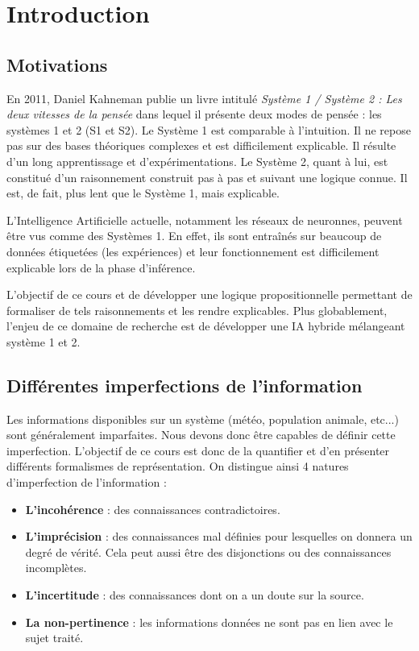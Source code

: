 \minitoc


\section{Introduction}

\subsection{Motivations} 

En 2011, Daniel Kahneman publie un livre intitulé \emph{Système 1 / Système 2 : Les deux vitesses de la pensée} 
dans lequel il présente deux modes de pensée : les systèmes 1 et 2 (S1 et S2). 
Le Système 1 est comparable à l'intuition. Il ne repose pas sur des bases théoriques complexes et 
est difficilement explicable. Il résulte d'un long apprentissage et d'expérimentations. 
Le Système 2, quant à lui, est constitué d'un raisonnement construit pas à pas et suivant 
une logique connue. Il est, de fait, plus lent que le Système 1, mais explicable. 

L'Intelligence Artificielle actuelle, notamment les réseaux de neuronnes, peuvent être vus comme des 
Systèmes 1. En effet, ils sont entraînés sur beaucoup de données étiquetées (les expériences)
et leur fonctionnement est difficilement explicable lors de la phase d'inférence. 

L'objectif de ce cours et de développer une logique propositionnelle permettant de formaliser 
de tels raisonnements et les rendre explicables. Plus globablement, l'enjeu de ce domaine de 
recherche est de développer une IA hybride mélangeant système 1 et 2. 

\subsection{Différentes imperfections de l'information}

Les informations disponibles sur un système (météo, population animale, etc...) sont généralement 
imparfaites. Nous devons donc être capables de définir cette imperfection. L'objectif de ce cours est 
donc de la quantifier et d'en présenter différents formalismes de représentation. 
On distingue ainsi 4 natures d'imperfection de l'information : 

\begin{itemize}
    \item \textbf{L'incohérence} : des connaissances contradictoires. 
    \item \textbf{L'imprécision} : des connaissances mal définies pour lesquelles on donnera un degré 
    de vérité. Cela peut aussi être des disjonctions ou des connaissances incomplètes.
    \item \textbf{L'incertitude} : des connaissances dont on a un doute sur la source. 
    \item \textbf{La non-pertinence} : les informations données ne sont pas en lien avec le sujet traité. 
\end{itemize}

